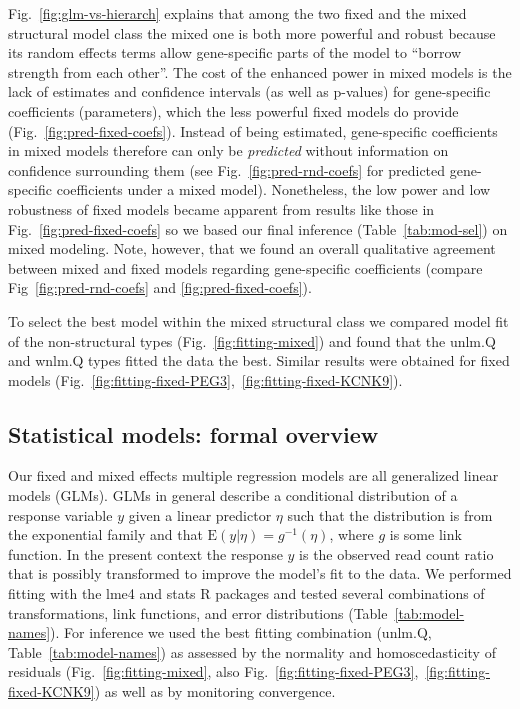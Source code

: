 \documentclass[letterpaper]{article}
\begin{document}
Fig.~\ref{fig:glm-vs-hierarch} explains that among the two fixed and the mixed
structural model class the mixed one is both more powerful and robust because
its random effects terms allow gene-specific parts of the model to ``borrow
strength from each other''.  The cost of the enhanced power in mixed models is
the lack of estimates and confidence intervals (as well as p-values) for
gene-specific coefficients (parameters), which the less powerful fixed models
do provide (Fig.~\ref{fig:pred-fixed-coefs}).  Instead of being estimated,
gene-specific coefficients in mixed models therefore can only be
\emph{predicted} without information on confidence surrounding them (see
Fig.~\ref{fig:pred-rnd-coefs} for predicted gene-specific coefficients under a
mixed model).  Nonetheless, the low power and low robustness of fixed models
became apparent from results like those in Fig.~\ref{fig:pred-fixed-coefs} so
we based our final inference (Table~\ref{tab:mod-sel}) on mixed modeling.
Note, however, that we found an overall qualitative agreement between mixed and
fixed models regarding gene-specific coefficients (compare
Fig~\ref{fig:pred-rnd-coefs} and \ref{fig:pred-fixed-coefs}).

To select the best model within the mixed structural class we compared model
fit of the non-structural types (Fig.~\ref{fig:fitting-mixed}) and found
that the unlm.Q and wnlm.Q types fitted the data the best.  Similar results
were obtained for fixed models
(Fig.~\ref{fig:fitting-fixed-PEG3},~\ref{fig:fitting-fixed-KCNK9}).

\subsection{Statistical models: formal overview}
\label{sec:regression-overview-formal}

Our fixed and mixed effects multiple regression models are all generalized
linear models (GLMs).  GLMs in general describe a conditional distribution of
a response variable \(y\) given a linear predictor \(\eta\) such that the
distribution is from the exponential family and that \(\mathrm{E}(y|\eta) =
g^{-1} (\eta)\), where \(g\) is some link function.  In the present context
the response \(y\) is the observed read count ratio that is possibly
transformed to improve the model's fit to the data.  We performed fitting with
the lme4 and stats R packages and tested several combinations of
transformations, link functions, and error distributions
(Table~\ref{tab:model-names}).  For inference we used the best fitting
combination (\(\mathrm{unlm.Q}\), Table~\ref{tab:model-names}) as assessed by
the normality and homoscedasticity of residuals (Fig.~\ref{fig:fitting-mixed},
also Fig.~\ref{fig:fitting-fixed-PEG3},~\ref{fig:fitting-fixed-KCNK9}) as well
as by monitoring convergence.
\end{document}
